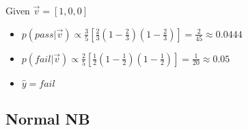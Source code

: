 \documentclass[xcolor=table]{beamer}
\begin{document}
\begin{frame}
	\vfill
	Given $ \vec{v} = [1, 0, 0]$
	\begin{itemize}
		\item $p(pass|\vec{v}) \propto \frac{3}{5} [\frac{2}{3} (1-\frac{2}{3}) (1-\frac{2}{3})]  = \frac{2}{45} \approx 0.0444$
		\item $p(fail|\vec{v}) \propto \frac{2}{5} [\frac{1}{2} (1-\frac{1}{2}) (1-\frac{1}{2})]  = \frac{1}{20} \approx 0.05$
		\item $ \hat{y} = fail $
	\end{itemize}
	
	
\end{frame}


\subsection{Normal NB}
\end{document}
